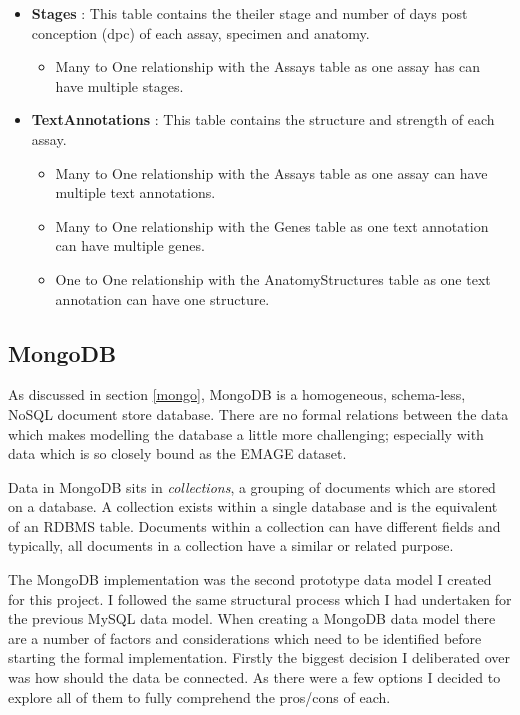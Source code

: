 \begin{itemize}
\item \textbf{Stages} : This table contains the theiler stage and number of days post conception (dpc) of each assay, specimen and anatomy.
\begin{itemize}
\item Many to One relationship with the Assays table as one assay has can have multiple stages.
\end{itemize} 

\item \textbf{TextAnnotations} : This table contains the structure and strength of each assay.
\begin{itemize}
\item Many to One relationship with the Assays table as one assay can have multiple text annotations.
\item Many to One relationship with the Genes table as one text annotation can have multiple genes.
\item One to One relationship with the AnatomyStructures table as one text annotation can have one structure.
\end{itemize} 

\end{itemize}

\subsection*{MongoDB}

As discussed in section \ref{mongo}, MongoDB is a homogeneous, schema-less, NoSQL document store database. There are no formal relations between the data which makes modelling the database a little more challenging; especially with data which is so closely bound as the EMAGE dataset.

Data in MongoDB sits in \textit{collections}, a grouping of documents which are stored on a database. A collection exists within a single database and is the equivalent of an RDBMS table. Documents within a collection can have different fields and typically, all documents in a collection have a similar or related purpose. 

The MongoDB implementation was the second prototype data model I created for this project. I followed the same structural process which I had undertaken for the previous MySQL data model. When creating a MongoDB data model there are a number of factors and considerations which need to be identified before starting the formal implementation. Firstly the biggest decision I deliberated over was how should the data be connected. As there were a few options I decided to explore all of them to fully comprehend the pros/cons of each.


